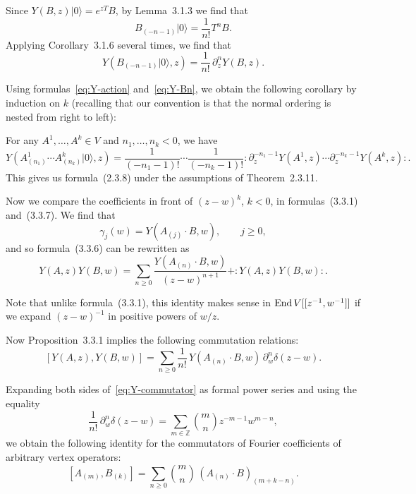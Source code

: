 \documentclass[12pt]{article}
\begin{document}
Since $Y(B,z)|0\rangle = e^{zT}B$, by Lemma~3.1.3 we find that
\[
B_{(-n-1)}|0\rangle = \frac{1}{n!}T^nB.
\]
Applying Corollary~3.1.6 several times, we find that
\begin{equation}\label{eq:Y-Bn}
Y(B_{(-n-1)}|0\rangle,z)
= \frac{1}{n!}\,\partial_z^n Y(B,z).
\end{equation}

Using formulas~\eqref{eq:Y-action} and~\eqref{eq:Y-Bn}, we obtain the following corollary by induction on $k$ (recalling that our convention is that the normal ordering is nested from right to left):

\begin{corollary}[3.3.5]
For any $A^1,\dots,A^k\in V$ and $n_1,\dots,n_k<0$, we have
\[
Y(A^1_{(n_1)}\cdots A^k_{(n_k)}|0\rangle,z)
= \frac{1}{(-n_1-1)!}\cdots\frac{1}{(-n_k-1)!}
:\partial_z^{-n_1-1}Y(A^1,z)\cdots\partial_z^{-n_k-1}Y(A^k,z):.
\]
This gives us formula~(2.3.8) under the assumptions of Theorem~2.3.11.
\end{corollary}


Now we compare the coefficients in front of $(z-w)^k$, $k<0$, in formulas~(3.3.1) and~(3.3.7).  
We find that
\[
\gamma_j(w) = Y(A_{(j)}\cdot B, w), \qquad j\ge0,
\]
and so formula~(3.3.6) can be rewritten as
\begin{equation}\label{eq:ope-positive}
Y(A,z)Y(B,w)
= \sum_{n\ge0} \frac{Y(A_{(n)}\cdot B, w)}{(z-w)^{n+1}}
+ :Y(A,z)Y(B,w):.
\end{equation}

Note that unlike formula~(3.3.1), this identity makes sense in $\operatorname{End} V[[z^{-1},w^{-1}]]$ if we expand $(z-w)^{-1}$ in positive powers of $w/z$.

Now Proposition~3.3.1 implies the following commutation relations:
\begin{equation}\label{eq:Y-commutator}
[Y(A,z),Y(B,w)]
= \sum_{n\ge0}\frac{1}{n!}\,Y(A_{(n)}\cdot B,w)\,\partial_w^n\delta(z-w).
\end{equation}

Expanding both sides of~\eqref{eq:Y-commutator} as formal power series and using the equality
\[
\frac{1}{n!}\,\partial_w^n\delta(z-w)
= \sum_{m\in\mathbb{Z}}\binom{m}{n}z^{-m-1}w^{m-n},
\]
we obtain the following identity for the commutators of Fourier coefficients of arbitrary vertex operators:
\begin{equation}\label{eq:A-B-comm}
[A_{(m)},B_{(k)}]
= \sum_{n\ge0}\binom{m}{n}\,(A_{(n)}\cdot B)_{(m+k-n)}.
\end{equation}
\end{document}
